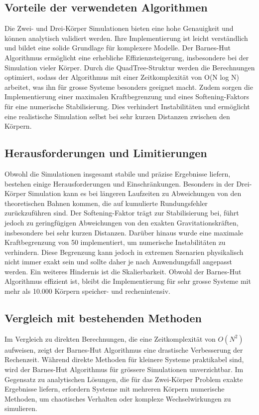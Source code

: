 \documentclass[a4paper,12pt,twoside]{article}
\begin{document}
\subsection{Vorteile der verwendeten Algorithmen}
Die Zwei- und Drei-Körper Simulationen bieten eine hohe Genauigkeit und können analytisch validiert werden. Ihre Implementierung ist leicht verständlich und bildet eine solide Grundlage für komplexere Modelle. Der Barnes-Hut Algorithmus ermöglicht eine erhebliche Effizienzsteigerung, insbesondere bei der Simulation vieler Körper. Durch die QuadTree-Struktur werden die Berechnungen optimiert, sodass der Algorithmus mit einer Zeitkomplexität von O(N log N) arbeitet, was ihn für grosse Systeme besonders geeignet macht. Zudem sorgen die Implementierung einer maximalen Kraftbegrenzung und eines Softening-Faktors für eine numerische Stabilisierung. Dies verhindert Instabilitäten und ermöglicht eine realistische Simulation selbst bei sehr kurzen Distanzen zwischen den Körpern.

\subsection{Herausforderungen und Limitierungen}
Obwohl die Simulationen insgesamt stabile und präzise Ergebnisse liefern, bestehen einige Herausforderungen und Einschränkungen. Besonders in der Drei-Körper Simulation kann es bei längeren Laufzeiten zu Abweichungen von den theoretischen Bahnen kommen, die auf kumulierte Rundungsfehler zurückzuführen sind. Der Softening-Faktor trägt zur Stabilisierung bei, führt jedoch zu geringfügigen Abweichungen von den exakten Gravitationskräften, insbesondere bei sehr kurzen Distanzen. Darüber hinaus wurde eine maximale Kraftbegrenzung von 50 implementiert, um numerische Instabilitäten zu verhindern. Diese Begrenzung kann jedoch in extremen Szenarien physikalisch nicht immer exakt sein und sollte daher je nach Anwendungsfall angepasst werden. Ein weiteres Hindernis ist die Skalierbarkeit. Obwohl der Barnes-Hut Algorithmus effizient ist, bleibt die Implementierung für sehr grosse Systeme mit mehr als 10.000 Körpern speicher- und rechenintensiv.

\subsection{Vergleich mit bestehenden Methoden}
Im Vergleich zu direkten Berechnungen, die eine Zeitkomplexität von \( O(N^2) \) aufweisen, zeigt der Barnes-Hut Algorithmus eine drastische Verbesserung der Rechenzeit. Während direkte Methoden für kleinere Systeme praktikabel sind, wird der Barnes-Hut Algorithmus für grössere Simulationen unverzichtbar. Im Gegensatz zu analytischen Lösungen, die für das Zwei-Körper Problem exakte Ergebnisse liefern, erfordern Systeme mit mehreren Körpern numerische Methoden, um chaotisches Verhalten oder komplexe Wechselwirkungen zu simulieren.
\end{document}
